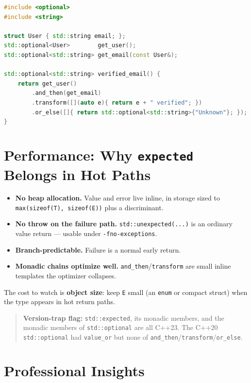 \begin{lstlisting}[language=C++, caption={Flattening nested optional lookups}]
#include <optional>
#include <string>

struct User { std::string email; };
std::optional<User>        get_user();
std::optional<std::string> get_email(const User&);

std::optional<std::string> verified_email() {
    return get_user()
        .and_then(get_email)
        .transform([](auto e){ return e + " verified"; })
        .or_else([]{ return std::optional<std::string>{"Unknown"}; });
}
\end{lstlisting}

\section{Performance: Why \texttt{expected} Belongs in Hot Paths}

\begin{itemize}
    \item \textbf{No heap allocation.} Value and error live inline, in storage sized to \lstinline|max(sizeof(T), sizeof(E))| plus a discriminant.
    \item \textbf{No throw on the failure path.} \lstinline|std::unexpected(...)| is an ordinary value return --- usable under \lstinline|-fno-exceptions|.
    \item \textbf{Branch-predictable.} Failure is a normal early return.
    \item \textbf{Monadic chains optimize well.} \lstinline|and_then|/\lstinline|transform| are small inline templates the optimizer collapses.
\end{itemize}

The cost to watch is \textbf{object size}: keep \lstinline|E| small (an \lstinline|enum| or compact struct) when the type appears in hot return paths.

\begin{quote}
\textbf{Version-trap flag:} \lstinline|std::expected|, its monadic members, and the monadic members of \lstinline|std::optional| are all C++23. The C++20 \lstinline|std::optional| had \lstinline|value_or| but none of \lstinline|and_then|/\lstinline|transform|/\lstinline|or_else|.
\end{quote}

\section{Professional Insights}

